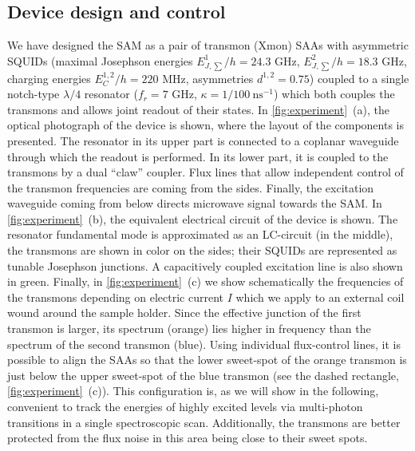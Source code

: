 \documentclass[%
 aps, prx,
 amsmath,amssymb,
 reprint,%
superscriptaddress
]{revtex4-2}
\begin{document}
\subsection{Device design and control}
We have designed the SAM as a pair of transmon 
(Xmon) SAAs with asymmetric 
SQUIDs \cite{hutchings2017tunable} (maximal Josephson energies $E^1_{J, 
\sum}/h = 24.3$ GHz, $E^2_{J,\sum}/h = 18.3$ GHz, 
charging energies $E^{1,2}_C/h = 220$ MHz, asymmetries $d^{1,2} =0.75$) coupled 
to a single notch-type \cite{probst2015efficient} 
$\lambda/4$ resonator ($f_r = 7$ GHz, $\kappa = 
1/100\ \text{ns}^{-1}$) which both 
couples \cite{majer2007coupling} the transmons and 
allows joint readout  \cite{chow2010detecting} of 
their states. In \autoref{fig:experiment}~(a), 
the optical photograph of the device is shown, where the layout of the components is presented. The 
resonator in its upper part is connected to a 
coplanar waveguide through which the readout is 
performed. In its lower part, it is coupled to 
the transmons by a dual 
``claw'' \cite{barends2013coherent} coupler. Flux 
lines that allow independent control of the 
transmon frequencies are coming from the sides. 
Finally, the excitation waveguide coming from 
below directs microwave signal towards the SAM. 
In \autoref{fig:experiment}~(b), the equivalent 
electrical circuit of the device is shown. The 
resonator fundamental mode is approximated as an 
LC-circuit (in the middle), the transmons are 
shown in color on the sides; their SQUIDs are 
represented as tunable Josephson junctions. A 
capacitively coupled excitation line is also 
shown in green. Finally, in 
\autoref{fig:experiment}~(c) we show 
schematically the frequencies of the transmons 
depending on electric current $I$ which we apply 
to an external coil wound around the sample 
holder. Since the effective junction of the first 
transmon is larger, its spectrum (orange) lies 
higher in frequency than the spectrum of the 
second transmon (blue). Using individual 
flux-control lines, it is possible to align the 
SAAs so that the lower sweet-spot of the orange 
transmon is just below the upper sweet-spot of 
the blue transmon (see the dashed rectangle,  
\autoref{fig:experiment}~(c)). This configuration 
is, as we will show in the following, convenient 
to track the energies of highly excited levels 
via multi-photon transitions in a single 
spectroscopic scan. Additionally, the transmons 
are better protected from the flux noise in this 
area being close to their sweet spots.
\end{document}
